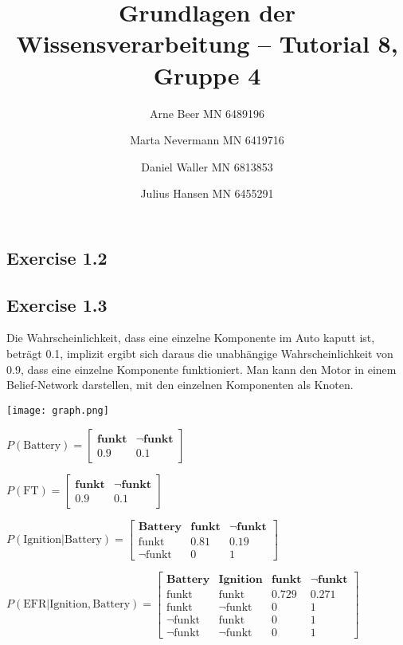 \documentclass[]{article}
\title{Grundlagen der Wissensverarbeitung -- Tutorial 8, Gruppe 4}
\author{Arne Beer MN 6489196 \and Marta Nevermann MN 6419716 \and Daniel Waller MN 6813853 \and Julius Hansen MN 6455291}
\date{}
\begin{document}
\maketitle


\subsection{Exercise 1.2}\label{exercise-1.2}

\subsection{Exercise 1.3}\label{exercise-1.3}

Die Wahrscheinlichkeit, dass eine einzelne Komponente im Auto kaputt
ist, beträgt 0.1, implizit ergibt sich daraus die unabhängige
Wahrscheinlichkeit von 0.9, dass eine einzelne Komponente funktioniert.
Man kann den Motor in einem Belief-Network darstellen, mit den einzelnen
Komponenten als Knoten.

\texttt{[image: graph.png]}

$
P(\text{Battery})=
\begin{bmatrix}
\textbf{funkt} & \neg\textbf{funkt}\\
0.9 & 0.1
\end{bmatrix}
$

$
P(\text{FT})=
\begin{bmatrix}
\textbf{funkt} & \neg\textbf{funkt}\\
0.9 & 0.1
\end{bmatrix}
$

$
P(\text{Ignition}|\text{Battery})=
\begin{bmatrix}
\textbf{Battery} &\textbf{funkt} & \neg\textbf{funkt}\\
\text{funkt} & 0.81& 0.19\\
\neg\text{funkt}& 0  & 1
\end{bmatrix}
$

$
P(\text{EFR}|\text{Ignition},\text{Battery})=
\begin{bmatrix}
\textbf{Battery} & \textbf{Ignition} &\textbf{funkt} & \neg\textbf{funkt}\\
\text{funkt} & \text{funkt} & 0.729& 0.271\\
\text{funkt} & \neg \text{funkt} & 0 & 1\\
\neg \text{funkt} & \text{funkt} & 0 & 1\\
\neg \text{funkt} & \neg\text{funkt}& 0  & 1
\end{bmatrix}
$
\end{document}
